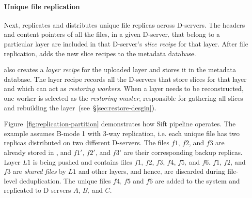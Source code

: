 \paragraph{Unique file replication}
%
%
Next,
\sysname replicates and distributes unique file replicas across D-servers.
%
The headers and content pointers of all the files, in a given D-server, that belong to a particular layer are included in that D-server's \emph{slice recipe} for that layer.
After file replication, \sysname adds the new slice recipes to the metadata database.

\sysname also creates a \emph{layer recipe} for the uploaded layer and stores it in the metadata database.
The layer recipe records all the D-servers that store slices for that layer and which can act
as \emph{restoring workers}. When a layer needs to be reconstructed,
one worker is selected as the \emph{restoring master}, responsible 
for gathering all slices and rebuilding the layer~(see~\S\ref{sec:restore-desgin}).

Figure~\ref{fig:replication-partition} demonstrates how Sift pipeline operates.
The example assumes B-mode 1 with 3-way replication, i.e. each unique file has two replicas distributed
on two different D-servers.
The files $f1$, $f2$, and $f3$ are already stored in \sysname,
and $f1'$, $f2'$, and $f3'$ are their corresponding backup replicas.
Layer $L1$ is being pushed and contains files $f1$, $f2$, $f3$, $f4$, $f5$, and $f6$. 
$f1$, $f2$, and $f3$ are \emph{shared files} by $L1$ and other layers, and hence,
are discarded during file-level deduplication.
The unique files $f4$, $f5$ and $f6$ are added to the system and
replicated to D-servers $A$, $B$, and $C$.


